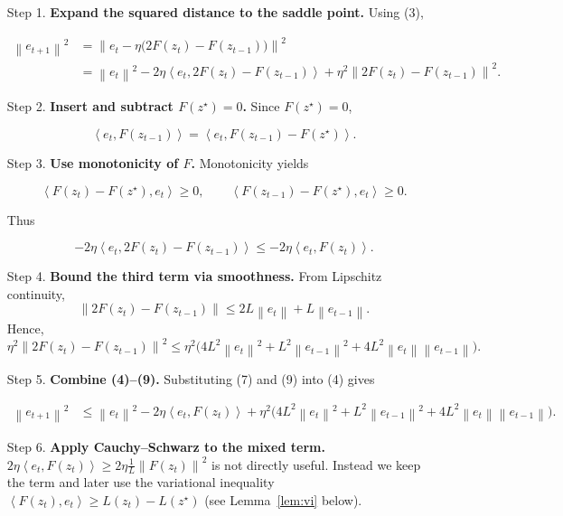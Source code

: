 \documentclass{article}
\newcommand{\norm}[1]{\left\|#1\right\|}
\newcommand{\iprod}[2]{\left\langle #1,#2\right\rangle}
\begin{document}
\medskip
\begin{enumerate}
\item[Step 1.] \textbf{Expand the squared distance to the saddle point.}  
Using (3),

\[
\begin{aligned}
\norm{e_{t+1}}^{2}
&= \norm{e_t-\eta\big(2F(z_t)-F(z_{t-1})\big)}^{2}\\
&= \norm{e_t}^{2}
-2\eta\iprod{e_t}{2F(z_t)-F(z_{t-1})}
+\eta^{2}\norm{2F(z_t)-F(z_{t-1})}^{2}.
\end{aligned}
\tag{4}
\]

\item[Step 2.] \textbf{Insert and subtract \(F(z^\star)=0\).}  
Since \(F(z^\star)=0\),

\[
\iprod{e_t}{F(z_{t-1})}
=\iprod{e_t}{F(z_{t-1})-F(z^\star)}.
\tag{5}
\]

\item[Step 3.] \textbf{Use monotonicity of \(F\).}  
Monotonicity yields  

\[
\iprod{F(z_t)-F(z^\star)}{e_t}\ge 0,
\qquad
\iprod{F(z_{t-1})-F(z^\star)}{e_t}\ge 0.
\tag{6}
\]

Thus  

\[
-2\eta\iprod{e_t}{2F(z_t)-F(z_{t-1})}
\le -2\eta\iprod{e_t}{F(z_t)}.
\tag{7}
\]

\item[Step 4.] \textbf{Bound the third term via smoothness.}  
From Lipschitz continuity,
\[
\norm{2F(z_t)-F(z_{t-1})}\le 2L\norm{e_t}+L\norm{e_{t-1}}.
\tag{8}
\]
Hence,
\[
\eta^{2}\norm{2F(z_t)-F(z_{t-1})}^{2}
\le \eta^{2}\big(4L^{2}\norm{e_t}^{2}+L^{2}\norm{e_{t-1}}^{2}+4L^{2}\norm{e_t}\norm{e_{t-1}}\big).
\tag{9}
\]

\item[Step 5.] \textbf{Combine (4)–(9).}  
Substituting (7) and (9) into (4) gives  

\[
\begin{aligned}
\norm{e_{t+1}}^{2}
&\le \norm{e_t}^{2}
-2\eta\iprod{e_t}{F(z_t)}
+\eta^{2}\big(4L^{2}\norm{e_t}^{2}+L^{2}\norm{e_{t-1}}^{2}+4L^{2}\norm{e_t}\norm{e_{t-1}}\big).
\end{aligned}
\tag{10}
\]

\item[Step 6.] \textbf{Apply Cauchy–Schwarz to the mixed term.}  
\(2\eta\iprod{e_t}{F(z_t)}\ge 2\eta\frac{1}{L}\norm{F(z_t)}^{2}\) is not directly useful.
Instead we keep the term and later use the variational inequality
\(\iprod{F(z_t)}{e_t}\ge L(z_t)-L(z^\star)\) (see Lemma~\ref{lem:vi} below).  


\end{enumerate}
\end{document}
